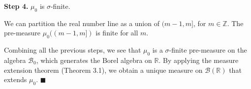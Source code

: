 \textbf{Step 4.} $\mu_0$ is $\sigma$-finite.

We can partition the real number line as a union of $(m - 1, m]$, for $m \in \mathbb{Z}$. The pre-measure $\mu_0((m - 1, m])$ is finite for all $m$.

Combining all the previous steps, we see that $\mu_0$ is a $\sigma$-finite pre-measure on the algebra $\mathcal{B}_0$, which generates the Borel algebra on $\mathbb{R}$. By applying the measure extension theorem (Theorem 3.1), we obtain a unique measure on $\mathcal{B}(\mathbb{R})$ that extends $\mu_0$. \hfill $\blacksquare$